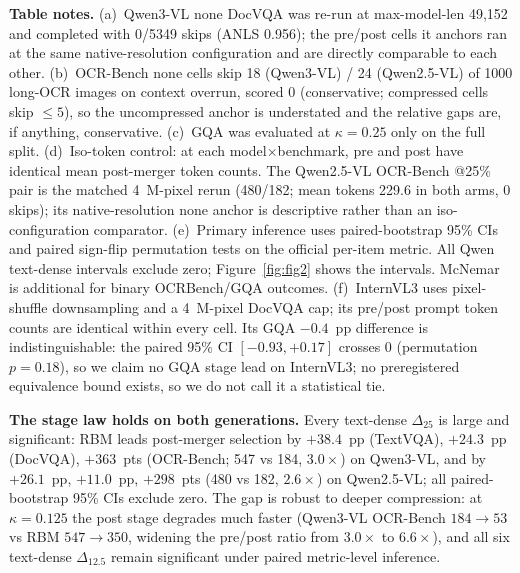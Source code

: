 \documentclass[sigconf,nonacm]{acmart}
\begin{document}
\begin{table}[t]
  \vspace{3pt}
  \footnotesize
  \textbf{Table notes.} (a)~Qwen3-VL none DocVQA was re-run at max-model-len
  49,152 and completed with 0/5349 skips (ANLS 0.956); the pre/post cells it
  anchors ran at the same native-resolution configuration and are directly
  comparable to each other. (b)~OCR-Bench none cells skip 18 (Qwen3-VL) / 24
  (Qwen2.5-VL) of 1000 long-OCR images on context overrun, scored 0
  (conservative; compressed cells skip $\leq 5$), so the uncompressed anchor is
  understated and the relative gaps are, if anything, conservative. (c)~GQA was
  evaluated at $\kappa = 0.25$ only on the full split. (d)~Iso-token control: at
  each model$\times$benchmark, pre and post have identical mean post-merger
  token counts. The Qwen2.5-VL OCR-Bench @25\% pair is the matched 4~M-pixel
  rerun (480/182; mean tokens 229.6 in both arms, 0 skips); its native-resolution
  none anchor is descriptive rather than an iso-configuration comparator.
  (e)~Primary inference uses paired-bootstrap 95\% CIs and
  paired sign-flip permutation tests on the official per-item metric. All Qwen
  text-dense intervals exclude zero; Figure~\ref{fig:fig2} shows the intervals.
  McNemar is additional for binary OCRBench/GQA outcomes. (f)~InternVL3 uses pixel-shuffle
  downsampling and a 4~M-pixel DocVQA cap; its pre/post prompt token counts are
  identical within every cell. Its GQA $-0.4$~pp difference is
  indistinguishable: the paired 95\% CI $[-0.93, +0.17]$ crosses 0 (permutation
  $p = 0.18$), so we claim no GQA stage lead on InternVL3; no preregistered
  equivalence bound exists, so we do not call it a statistical tie.
\end{table}

\textbf{The stage law holds on both generations.} Every text-dense
$\Delta_{25}$ is large and significant: RBM leads post-merger selection by
$+38.4$~pp (TextVQA), $+24.3$~pp (DocVQA), $+363$~pts (OCR-Bench; 547 vs 184,
$3.0\times$) on Qwen3-VL, and by $+26.1$~pp, $+11.0$~pp, $+298$~pts (480 vs 182,
$2.6\times$) on Qwen2.5-VL; all paired-bootstrap 95\% CIs exclude zero. The gap is robust to
deeper compression: at $\kappa = 0.125$ the post stage degrades much faster
(Qwen3-VL OCR-Bench $184 \to 53$ vs RBM $547 \to 350$, widening the pre/post
ratio from $3.0\times$ to $6.6\times$), and all six text-dense $\Delta_{12.5}$
remain significant under paired metric-level inference.
\end{document}

